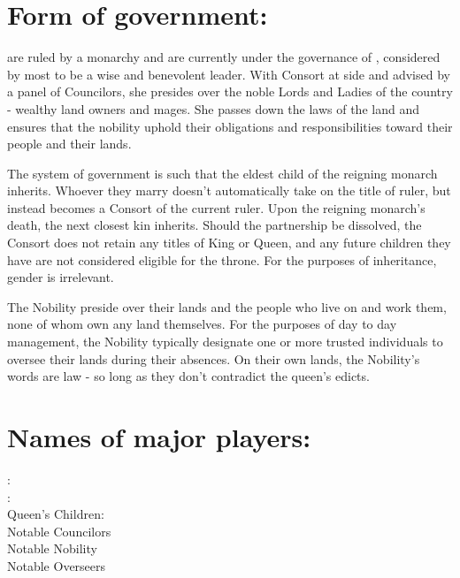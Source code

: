 \documentclass[blue]{GL2020}
\begin{document}
\name{\bAgrarians{}}
\section*{Form of government:}

\pFarm{} are ruled by a monarchy and are currently under the governance of \cQueen{}, considered by most to be a wise and benevolent leader.  With \cQueen{\they} Consort at \cQueen{\their} side and advised by a panel of Councilors, she presides over the noble Lords and Ladies of the country - wealthy land owners and mages.  She passes down the laws of the land and ensures that the nobility uphold their obligations and responsibilities toward their people and their lands.

The system of government is such that the eldest child of the reigning monarch inherits.  Whoever they marry doesn't automatically take on the title of ruler, but instead becomes a Consort of the current ruler.  Upon the reigning monarch's death, the next closest kin inherits.  Should the partnership be dissolved, the Consort does not retain any titles of King or Queen, and any future children they have are not considered eligible for the throne.  For the purposes of inheritance, gender is irrelevant.

The Nobility preside over their lands and the people who live on and work them, none of whom own any land themselves.  For the purposes of day to day management, the Nobility typically designate one or more trusted individuals to oversee their lands during their absences.  On their own lands, the Nobility's words are law - so long as they don't contradict the queen's edicts.


\section*{Names of major players:}

\cQueen{}:\\
\cConsort{}:\\
Queen's Children:\\
Notable Councilors\\
Notable Nobility\\
Notable Overseers\\
\end{document}
